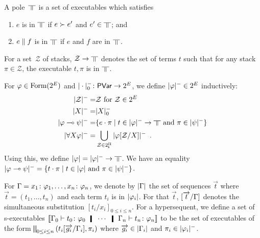 
\begin{definition}
 \label{ex:def:pole}
A pole~$\bbot$ is a set of executables
which satisfies
\begin{enumerate}
 \item \label{ex:red-closed} $e$ is in $\bbot$ if $e\succ e'$ and
       $e'\in\bbot$; and
 \item \label{ex:conc-closed} $e\parallel f$ is in $\bbot$ if $e$ and $f$ are in $\bbot$.
\end{enumerate}
\end{definition}

For a set~$\mathcal Z$ of
stacks, $\mathcal Z\rightarrow\bbot$ denotes
the set of
terms
$t$ such that
for any
stack $\pi\in\mathcal Z$,
the executable $t,\pi$ is in $\bbot$.

For $\varphi\in\mathop{\text{Form}}(2^E)$ and $|\cdot|^-_0\colon\mathsf{PVar}\rightarrow 2^E$\kern
-2pt,
we define $|{\varphi}|^-\in
2^E$ inductively:
\begin{align*}
 \nsem{\mathcal Z} =& \mathcal Z \text{ for } \mathcal Z\in 2^E\\
 \nsem{X}=& |X|_0^- \\
 \nsem{\phi\limp\psi}=&
 \{e\cdot\pi\mid  t\in\nsem\phi\rightarrow\bbot
 \text{ and  }\pi\in\nsem\psi\}\\
 \nsem{\forall X\phi}=&
 \bigcup_{\mathcal Z\in 2^\sPi} \nsem{\phi[\mathcal Z/X]}\enspace.
\end{align*}
Using this, we define $\sem \phi=\nsem{\phi}\rightarrow\bbot$.
We have an equality
$|{\varphi\multimap\psi}|^- = \{t\cdot\pi\mid
t\in|{\varphi}|\text{ and }\pi\in|{\psi}|^-\}$.

For $\Gamma = {x_1} \colon{\varphi_1},\ldots,{x_n} \colon{\varphi_n}$,
we denote by $|{\Gamma}|$ the set of sequences $\vec t$ where
$\vec{t} = (t_1,\dots,t_n)$
 and each term $t_i$ is in $|{\varphi_i}|$.
For that $\vec t$, $[\overrightarrow{t}/\Gamma]$ denotes the simultaneous substitution
$[t_i/x_i]_{0\le i \le n}$.
For a hypersequent, we
define a set of s-executables
$
\semo{\G_0\tr\tj{t_0}{\phi_0}\hmid\cdots\hmid\G_n\tr\tj{t_n}{\phi_n}}
$
to be the set of executables of the form $\bigparallel_{0\le i\le
n}\left(t_i[\overrightarrow{g_i}/\Gamma_i],\pi_i\right)$ where
$\overrightarrow{g_i} \in |{\Gamma_i}|$ and $\pi_i\in |{\varphi_i}|^-$.

